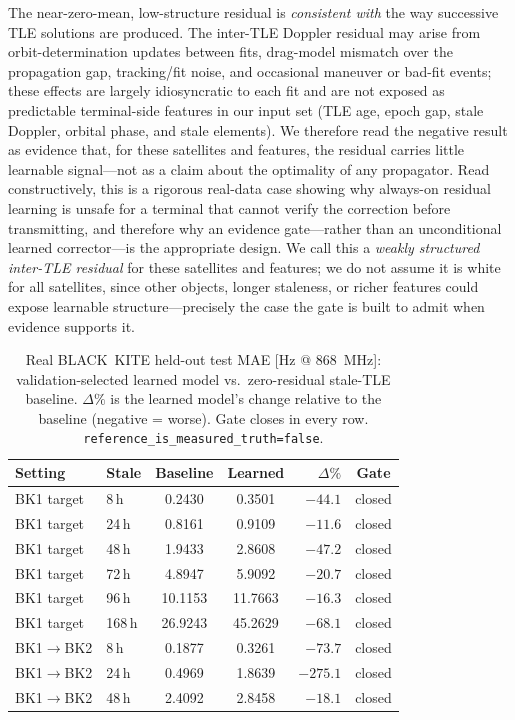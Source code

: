 \documentclass[conference]{IEEEtran}
\begin{document}
The near-zero-mean, low-structure residual is \emph{consistent with} the way
successive TLE solutions are produced. The inter-TLE Doppler residual may arise
from orbit-determination updates between fits, drag-model mismatch over the
propagation gap, tracking/fit noise, and occasional maneuver or bad-fit events;
these effects are largely idiosyncratic to each fit and are not exposed as
predictable terminal-side features in our input set (TLE age, epoch gap, stale
Doppler, orbital phase, and stale elements). We therefore read the negative
result as evidence that, for these satellites and features, the residual carries
little learnable signal---not as a claim about the optimality of any propagator.
Read constructively, this is a rigorous real-data case showing why always-on
residual learning is unsafe for a terminal that cannot verify the correction
before transmitting, and therefore why an evidence gate---rather than an
unconditional learned corrector---is the appropriate design. We call this a
\emph{weakly structured inter-TLE residual} for these satellites and features; we
do not assume it is white for all satellites, since other objects, longer
staleness, or richer features could expose learnable structure---precisely the
case the gate is built to admit when evidence supports it.

\begin{table}[t]
\centering
\small
\caption{Real BLACK~KITE held-out test MAE [Hz @ 868~MHz]: validation-selected
learned model vs.\ zero-residual stale-TLE baseline. $\Delta\%$ is the learned
model's change relative to the baseline (negative = worse). Gate closes in every
row. \texttt{reference\_is\_measured\_truth=false}.}
\label{tab:bk}
\begin{tabular}{llccr c}
\toprule
Setting & Stale & Baseline & Learned & $\Delta\%$ & Gate \\
\midrule
BK1 target & 8\,h   & 0.2430 & 0.3501 & $-44.1$ & closed \\
BK1 target & 24\,h  & 0.8161 & 0.9109 & $-11.6$ & closed \\
BK1 target & 48\,h  & 1.9433 & 2.8608 & $-47.2$ & closed \\
BK1 target & 72\,h  & 4.8947 & 5.9092 & $-20.7$ & closed \\
BK1 target & 96\,h  & 10.1153& 11.7663& $-16.3$ & closed \\
BK1 target & 168\,h & 26.9243& 45.2629& $-68.1$ & closed \\
\midrule
BK1$\to$BK2 & 8\,h  & 0.1877 & 0.3261 & $-73.7$ & closed \\
BK1$\to$BK2 & 24\,h & 0.4969 & 1.8639 & $-275.1$& closed \\
BK1$\to$BK2 & 48\,h & 2.4092 & 2.8458 & $-18.1$ & closed \\
\bottomrule
\end{tabular}
\end{table}
\end{document}
